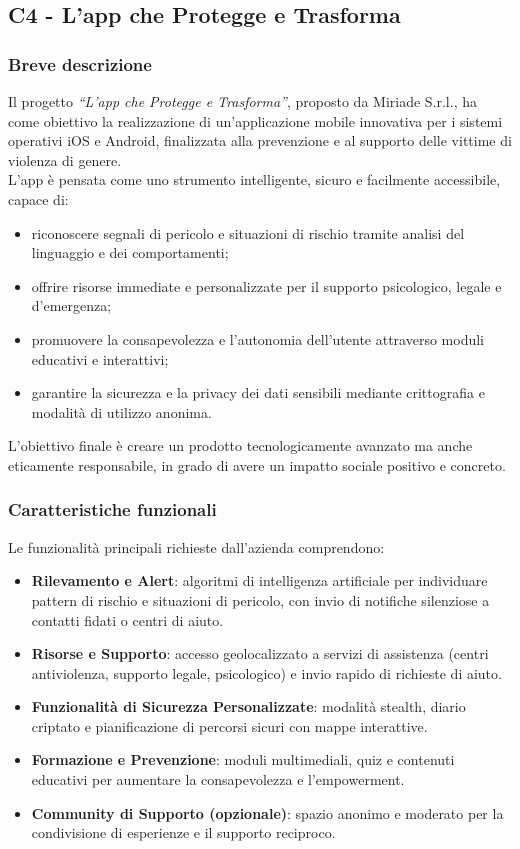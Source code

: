 \documentclass[a4paper,11pt]{article}
\begin{document}
\subsection{C4 - L'app che Protegge e Trasforma}
\subsubsection{Breve descrizione}
Il progetto \textit{``L'app che Protegge e Trasforma''}, proposto da Miriade S.r.l., ha come obiettivo la realizzazione di un'applicazione mobile innovativa per i sistemi operativi iOS e Android, finalizzata alla prevenzione e al supporto delle vittime di violenza di genere.\\

L'app è pensata come uno strumento intelligente, sicuro e facilmente accessibile, capace di:
\begin{itemize}
    \item riconoscere segnali di pericolo e situazioni di rischio tramite analisi del linguaggio e dei comportamenti;
    \item offrire risorse immediate e personalizzate per il supporto psicologico, legale e d'emergenza;
    \item promuovere la consapevolezza e l'autonomia dell'utente attraverso moduli educativi e interattivi;
    \item garantire la sicurezza e la privacy dei dati sensibili mediante crittografia e modalità di utilizzo anonima.
\end{itemize}
L'obiettivo finale è creare un prodotto tecnologicamente avanzato ma anche eticamente responsabile, in grado di avere un impatto sociale positivo e concreto.

\subsubsection{Caratteristiche funzionali}
Le funzionalità principali richieste dall'azienda comprendono:
\begin{itemize}
    \item \textbf{Rilevamento e Alert}: algoritmi di intelligenza artificiale per individuare pattern di rischio e situazioni di pericolo, con invio di notifiche silenziose a contatti fidati o centri di aiuto.
    \item \textbf{Risorse e Supporto}: accesso geolocalizzato a servizi di assistenza (centri antiviolenza, supporto legale, psicologico) e invio rapido di richieste di aiuto.
    \item \textbf{Funzionalità di Sicurezza Personalizzate}: modalità stealth, diario criptato e pianificazione di percorsi sicuri con mappe interattive.
    \item \textbf{Formazione e Prevenzione}: moduli multimediali, quiz e contenuti educativi per aumentare la consapevolezza e l'empowerment.
    \item \textbf{Community di Supporto (opzionale)}: spazio anonimo e moderato per la condivisione di esperienze e il supporto reciproco.
\end{itemize}
\end{document}
